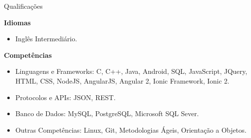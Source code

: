 \documentclass{resume} %
\begin{document}
\begin{rSection}{Qualificações}

\textbf{Idiomas}
\begin{itemize}
	\item Inglês Intermediário.
\end{itemize}

\textbf{Competências}
\begin{itemize}
	\item Linguagens e Frameworks: C, C++, Java, Android, SQL, JavaScript, JQuery, HTML, CSS, NodeJS, AngularJS, Angular 2, Ionic Framework, Ionic 2.
	\item Protocolos e APIs: JSON, REST.
	\item Banco de Dados: MySQL, PostgreSQL, Microsoft SQL Sever.
	\item Outras Competências: Linux, Git, Metodologias Ágeis, Orientação a Objetos.
\end{itemize}

\end{rSection}
\end{document}
